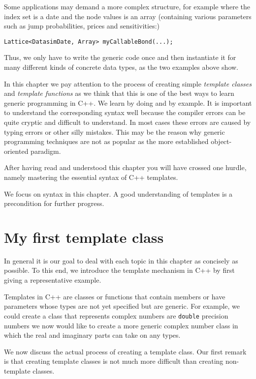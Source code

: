 Some applications may demand a more complex structure, for example where the index set is a date and the node values is an array (containing various parameters such as jump probabilities, prices and sensitivities:)
\begin{lstlisting}
Lattice<DatasimDate, Array> myCallableBond(...);
\end{lstlisting}
Thus, we only have to write the generic code once and then instantiate it for many different kinds of concrete data types, as the two examples above show.

In this chapter we pay attention to the process of creating simple \emph{template classes} and \emph{template functions} as we think that this is one of the best ways to learn generic programming in C++. We learn by doing and by example. It is important to understand the corresponding syntax well because the compiler errors can be quite cryptic and difficult to understand. In most cases these errors are caused by typing errors or other silly mistakes. This may be the reason why generic programming techniques are not as popular as the more established object-oriented paradigm.

After having read and understood this chapter you will have crossed one hurdle, namely mastering the essential syntax of C++ templates.

We focus on syntax in this chapter. A good understanding of templates is a precondition for further progress.


\section{My first template class}

In general it is our goal to deal with each topic in this chapter as concisely as possible. To this end, we introduce the template mechanism in C++ by first giving a representative example.

Templates in C++ are classes or functions that contain members or have parameters whose types are not yet specified but are generic. For example, we could create a class that represents complex numbers are \texttt{double} precision numbers we now would like to create a more generic complex number class in which the real and imaginary parts can take on any types.

We now discuss the actual process of creating a template class. Our first remark is that creating template classes is not much more difficult than creating non-template classes.

